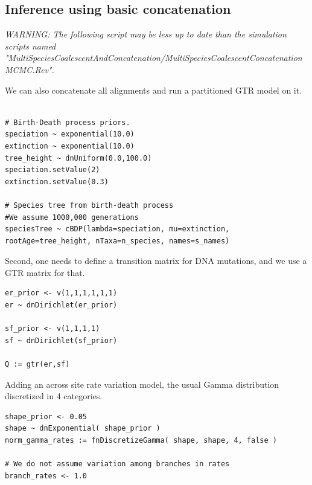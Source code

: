 \documentclass[11pt]{article}
\begin{document}
\subsection{Inference using basic concatenation }

{\begin{framed}
\begin{center}
\emph{WARNING: The following script may be less up to date than the simulation scripts named "MultiSpeciesCoalescentAndConcatenation/MultiSpeciesCoalescentConcatenationMCMC.Rev".}
\end{center}
\end{framed}}
\vspace{5mm}
We can also concatenate all alignments and run a partitioned GTR model on it.


 {\begin{framed}
 {\tt \begin{snugshade*}
\begin{lstlisting}

# Birth-Death process priors.
speciation ~ exponential(10.0)
extinction ~ exponential(10.0)
tree_height ~ dnUniform(0.0,100.0)
speciation.setValue(2)
extinction.setValue(0.3)

# Species tree from birth-death process
#We assume 1000,000 generations
speciesTree ~ cBDP(lambda=speciation, mu=extinction, rootAge=tree_height, nTaxa=n_species, names=s_names)
\end{lstlisting}
\end{snugshade*}}
Second, one needs to define a transition matrix for DNA mutations, and we use a GTR matrix for that.

 {\tt \begin{snugshade*}
\begin{lstlisting}
er_prior <- v(1,1,1,1,1,1)
er ~ dnDirichlet(er_prior)

sf_prior <- v(1,1,1,1)
sf ~ dnDirichlet(sf_prior)

Q := gtr(er,sf) 
\end{lstlisting}
\end{snugshade*}}

Adding an across site rate variation model, the usual Gamma distribution discretized in 4 categories.
 {\tt \begin{snugshade*}
\begin{lstlisting}
shape_prior <- 0.05 
shape ~ dnExponential( shape_prior )
norm_gamma_rates := fnDiscretizeGamma( shape, shape, 4, false )

# We do not assume variation among branches in rates
branch_rates <- 1.0


\end{lstlisting}
\end{snugshade*}}
\end{framed}}
\end{document}

